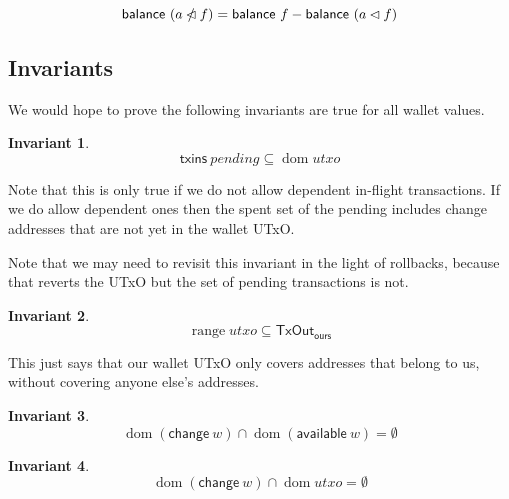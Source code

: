 \documentclass{article}
\DeclareMathOperator{\dom}{dom}
\DeclareMathOperator{\range}{range}
\newcommand{\restrictdom}{\lhd}
\newcommand{\subtractdom}{\mathbin{\slashed{\restrictdom}}}
\newtheorem{invariant}{Invariant}
\begin{document}
\begin{equation} \label{lemma_balance_union}
  \mathsf{balance} ~ (a \subtractdom f) = \mathsf{balance} ~ f - \mathsf{balance} ~ (a \restrictdom f) \\
\end{equation}


\subsection{Invariants}
\label{sec:invariants}

We would hope to prove the following invariants are true for all wallet values.

\begin{invariant}
\begin{equation*}
\mathsf{txins} ~ pending \subseteq \dom utxo
\end{equation*}
\label{inv:txins_in_dom_utxo}
\end{invariant}

Note that this is only true if we do not allow dependent in-flight transactions.
If we do allow dependent ones then the spent set of the pending includes change
addresses that are not yet in the wallet UTxO.

Note that we may need to revisit this invariant in the light of rollbacks,
because that reverts the UTxO but the set of pending transactions is not.

\begin{invariant}
\begin{equation*}
\range utxo \subseteq \mathsf{TxOut_{ours}}
\end{equation*}
\label{inv:utxo_is_ours}
\end{invariant}

This just says that our wallet UTxO only covers addresses that belong to us,
without covering anyone else's addresses.

\begin{invariant}
\begin{equation*}
\dom (\mathsf{change} ~ w) \cap \dom (\mathsf{available} ~ w) = \emptyset
\end{equation*}
\label{inv:change_vs_available}
\end{invariant}

\begin{invariant}
\begin{equation*}
\dom (\mathsf{change} ~ w) \cap \dom utxo = \emptyset
\end{equation*}
\label{inv:change_vs_utxo}
\end{invariant}
\end{document}
